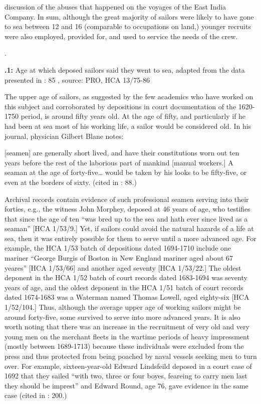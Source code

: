 discussion of the abuses that happened on the voyages of the East India Company. In sum, although the great majority of sailors were likely to have gone to sea between 12 and 16 (comparable to occupations on land,) younger recruits were also employed, provided for, and used to service the needs of the crew.

 

.

\textbf{.1:} Age at which deposed sailors said they went to sea, adapted from the data presented in \citealt{Earle1998}: 85 , source: PRO, HCA 13/75-86

The upper age of sailors, as suggested by the few academics who have worked on this subject and corroborated by depositions in court documentation of the 1620-1750 period, is around fifty years old. At the age of fifty, and particularly if he had been at sea most of his working life, a sailor would be considered old.  In his journal, physician Gilbert Blane notes:

[seamen] are generally short lived, and have their constitutions worn out ten years before the rest of the laborious part of mankind [manual workers.] A seaman at the age of forty-five… would be taken by his looks to be fifty-five, or even at the borders of sixty. (cited in \citealt{AdkinsAdkins2008}: 88.) 

Archival records contain evidence of such professional seamen serving into their forties, e.g., the witness John Morphey, deposed at 46 years of age, who testifies that since the age of ten “was bred up to the sea and hath ever since lived as a seaman” [HCA 1/53/9.] Yet, if sailors could avoid the natural hazards of a life at sea, then it was entirely possible for them to serve until a more advanced age. For example, the HCA 1/53 batch of depositions dated 1694-1710 include one mariner “George Burgis of Boston in New England mariner aged about 67 yeares” [HCA 1/53/66] and another aged seventy [HCA 1/53/22.] The oldest deponent in the HCA 1/52 batch of court records dated 1683-1694 was seventy years of age, and the oldest deponent in the HCA 1/51 batch of court records dated 1674-1683 was a Waterman named Thomas Lowell, aged eighty-six [HCA 1/52/104.] Thus, although the average upper age of working sailors might be around forty-five, some survived to serve into more advanced years. It is also worth noting that there was an increase in the recruitment of very old and very young men on the merchant fleets in the wartime periods of heavy impressment (mostly between 1689-1713) because these individuals were excluded from the press and thus protected from being poached by naval vessels seeking men to turn over. For example, sixteen-year-old Edward Lindsfeild deposed in a court case of 1692 that they sailed “with two, three or four boyes, feareing to carry men last they should be imprest” and Edward Round, age 76, gave evidence in the same case (cited in \citealt{Earle1998}: 200.) 


